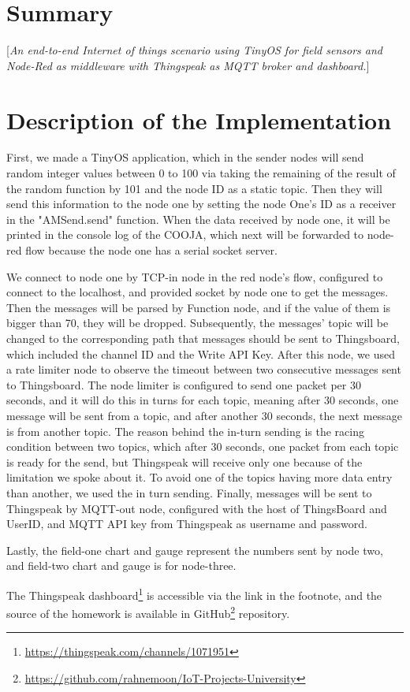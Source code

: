 \documentclass[10pt,english, openany]{book}
\begin{document}
\chapter{Summary}\label{chapt:sum}
[\textit{An end-to-end Internet of things scenario using TinyOS for field sensors and Node-Red as middleware with Thingspeak as MQTT broker and dashboard.}]
\chapter{Description of the Implementation}
First, we made a TinyOS application, which in the sender nodes will send random integer values between 0 to 100 via taking the remaining of the result of the random function by 101 and the node ID as a static topic. Then they will send this information to the node one by setting the node One's ID as a receiver in the "AMSend.send" function. When the data received by node one, it will be printed in the console log of the COOJA, which next will be forwarded to node-red flow because the node one has a serial socket server.\par
We connect to node one by TCP-in node in the red node's flow, configured to connect to the localhost, and provided socket by node one to get the messages. Then the messages will be parsed by Function node, and if the value of them is bigger than 70, they will be dropped. Subsequently, the messages' topic will be changed to the corresponding path that messages should be sent to Thingsboard, which included the channel ID and the Write API Key. After this node, we used a rate limiter node to observe the timeout between two consecutive messages sent to Thingsboard. The node limiter is configured to send one packet per 30 seconds, and it will do this in turns for each topic, meaning after 30 seconds, one message will be sent from a topic, and after another 30 seconds, the next message is from another topic. The reason behind the in-turn sending is the racing condition between two topics, which after 30 seconds, one packet from each topic is ready for the send, but Thingspeak will receive only one because of the limitation we spoke about it. To avoid one of the topics having more data entry than another, we used the in turn sending. Finally, messages will be sent to Thingspeak by MQTT-out node, configured with the host of ThingsBoard and UserID, and MQTT API key from Thingspeak as username and password.\par
Lastly, the field-one chart and gauge represent the numbers sent by node two, and field-two chart and gauge is for node-three. 

The Thingspeak dashboard\footnote{\url{https://thingspeak.com/channels/1071951}} is accessible via the link in the footnote, and the source of the homework is available in GitHub\footnote{\url{https://github.com/rahnemoon/IoT-Projects-University}} repository.
\end{document}

